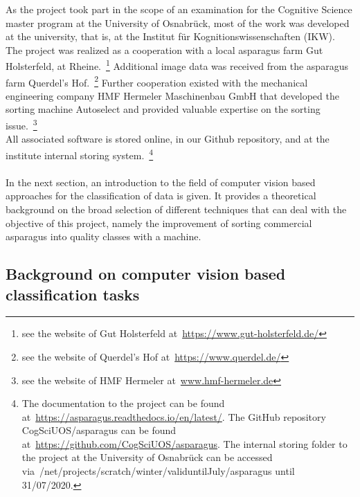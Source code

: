 As the project took part in the scope of an examination for the Cognitive Science master program at the University of Osnabrück, most of the work was developed at the university, that is, at the Institut für Kognitionswissenschaften (IKW).
The project was realized as a cooperation with a local asparagus farm Gut Holsterfeld, at Rheine.~\footnote{see the website of Gut Holsterfeld at~\url{https://www.gut-holsterfeld.de/}} Additional image data was received from the asparagus farm Querdel’s Hof.~\footnote{see the website of Querdel’s Hof at~\url{https://www.querdel.de/}} Further cooperation existed with the mechanical engineering company HMF Hermeler Maschinenbau GmbH that developed the sorting machine Autoselect and provided valuable expertise on the sorting issue.~\footnote{see the website of HMF Hermeler at~\url{www.hmf-hermeler.de}} \\
All associated software is stored online, in our Github repository, and at the institute internal storing system.~\footnote{The documentation to the project can be found at~\url{https://asparagus.readthedocs.io/en/latest/}. The GitHub repository CogSciUOS/asparagus can be found at~\url{https://github.com/CogSciUOS/asparagus}. The internal storing folder to the project at the University of Osnabrück can be accessed via~/net/projects/scratch/winter/valid\textunderscore until\textunderscore July/asparagus until 31/07/2020.} \\
\\
In the next section, an introduction to the field of computer vision based approaches for the classification of data is given. It provides a theoretical background on the broad selection of different techniques that can deal with the objective of this project, namely the improvement of sorting commercial asparagus into quality classes with a machine.



\subsection{Background on computer vision based classification tasks}
\label{sec:BackgroundCV}

